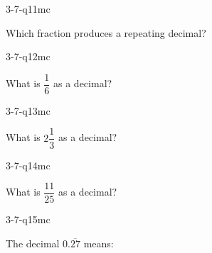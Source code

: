 \begin{practiceQuestion}{3-7-q11}{mc}
\begin{questionText}
Which fraction produces a repeating decimal?
\end{questionText}
\end{practiceQuestion}

\begin{practiceQuestion}{3-7-q12}{mc}
\begin{questionText}
What is $\dfrac{1}{6}$ as a decimal?
\end{questionText}
\end{practiceQuestion}

\begin{practiceQuestion}{3-7-q13}{mc}
\begin{questionText}
What is $2\dfrac{1}{3}$ as a decimal?
\end{questionText}
\end{practiceQuestion}

\begin{practiceQuestion}{3-7-q14}{mc}
\begin{questionText}
What is $\dfrac{11}{25}$ as a decimal?
\end{questionText}
\end{practiceQuestion}

\begin{practiceQuestion}{3-7-q15}{mc}
\begin{questionText}
The decimal $0.\overline{27}$ means:
\end{questionText}
\choiceB{$0.2777\ldots$}
\choiceC{$0.272727\ldots$}
\choiceD{$0.27027027\ldots$}
\end{practiceQuestion}

